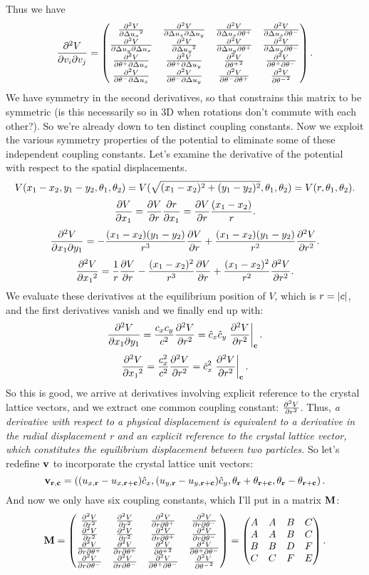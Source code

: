 \documentclass[12pt]{article}
\begin{document}
Thus we have
\[ \frac{\del^2 V}{\del v_i \del v_j} = \pmtrx{\pdert{V}{\D u_x} & \pdder{V}{\D u_x}{\D u_y} & \pdder{V}{\D u_x}{\th^+} & \pdder{V}{\D u_x}{\th^-} \\ \pdder{V}{\D u_y}{\D u_x} & \pdert{V}{\D u_y} & \pdder{V}{\D u_y}{\th^+} & \pdder{V}{\D u_y}{\th^-} \\ \pdder{V}{\th^+}{\D u_x} & \pdder{V}{\th^+}{\D u_y} & \pdert{V}{\th^+} & \pdder{V}{\th^+}{\th^-} \\ \pdder{V}{\th^-}{\D u_x} & \pdder{V}{\th^-}{\D u_y} & \pdder{V}{\th^-}{\th^+} & \pdert{V}{\th^-}}.\]
We have symmetry in the second derivatives, so that constrains this matrix to be symmetric (is this necessarily so in 3D when rotations don't commute with each other?). So we're already down to ten distinct coupling constants. Now we exploit the various symmetry properties of the potential to eliminate some of these independent coupling constants. Let's examine the derivative of the potential with respect to the spatial displacements.
\[ V(x_1-x_2,y_1-y_2,\th_1,\th_2) = V(\sqrt{(x_1-x_2)^2+(y_1-y_2)^2},\th_1,\th_2) = V(r,\th_1,\th_2).\]
\[ \pder{V}{x_1} = \pder{V}{r}\pder{r}{x_1} = \pder{V}{r}\frac{(x_1-x_2)}{r}.\]
\[ \pdder{V}{x_1}{y_1} = -\frac{(x_1-x_2) (y_1-y_2)}{r^3}\pder{V}{r} + \frac{(x_1-x_2)(y_1-y_2)}{r^2} \pdert V r.\]
\[ \pdert{V}{x_1} = \recip{r} \pder V r - \frac{(x_1-x_2)^2}{r^3}\pder V r + \frac{(x_1-x_2)^2}{r^2} \pdert V r.\]
We evaluate these derivatives at the equilibrium position of $V$, which is $r = \abs{c}$, and the first derivatives vanish and we finally end up with:
\[ \pdder{V}{x_1}{y_1} = \frac{c_x c_y}{c^2}\pdert V r = \hat c _x \hat c_y \left. \pdert V r\right |_{\bv c}.\]
\[ \pdert {V }{x_1} = \frac{c_x^2}{c^2} \pdert V r = \hat c_x^2 \left. \pdert V r\right |_{\bv c}.\]
So this is good, we arrive at derivatives involving explicit reference to the crystal lattice vectors, and we extract one common coupling constant: $\pdert V r$. Thus, \emph{ a derivative with respect to a physical displacement is equivalent to a derivative in the radial displacement r and an explicit reference to the crystal lattice vector, which constitutes the equilibrium displacement between two particles.} So let's redefine $\bv v$ to incorporate the crystal lattice unit vectors:
\[ \bv v_{\br,\bv c} = \paren{ (u_{x,\br} - u_{x,\br + \bv c})\hat c_x, (u_{y,\br} - u_{y,\br+\bv c}) \hat c_y, \th_\br + \th_{\br + \bv c},\th_\br - \th_{\br + \bv c}}.\]
And now we only have six coupling constants, which I'll put in a matrix $\bv M$:
\[ \bv M = \pmtrx{\pdert V r & \pdert V r & \pdder{V}{r}{\th^+} &  \pdder{V}{r}{\th^-} \\ \pdert V r & \pdert V r & \pdder{V}{r}{\th^+} & \pdder{V}{r}{\th^-} \\ \pdder{V}{r}{\th^+} & \pdder{V}{r}{\th^+} & \pdert{V}{\th^+} & \pdder{V}{\th^+}{\th^-} \\ \pdder{V}{r}{\th^-} & \pdder{V}{r}{\th^-} & \pdder{V}{\th^+}{\th^-} & \pdert {V}{\th^-}} = \pmtrx{ A & A & B & C \\ A & A & B & C \\ B & B & D & F \\ C & C & F & E}.\]
\end{document}
